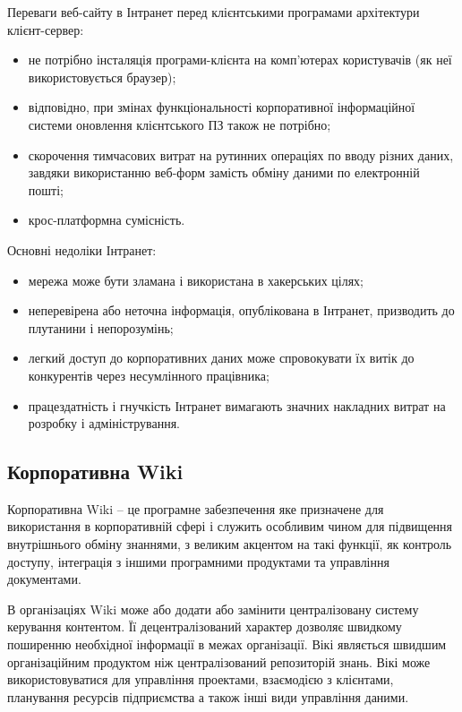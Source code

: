 Переваги веб-сайту в Інтранет перед клієнтськими програмами архітектури клієнт-сервер:
\begin{itemize}
\item не потрібно інсталяція програми-клієнта на комп'ютерах користувачів (як неї використовується браузер);
\item відповідно, при змінах функціональності корпоративної інформаційної системи оновлення клієнтського ПЗ також не потрібно;
\item  скорочення тимчасових витрат на рутинних операціях по вводу різних даних, завдяки використанню веб-форм замість обміну даними по електронній пошті;
\item крос-платформна сумісність.%
\end{itemize}


Основні недоліки Інтранет:
\begin{itemize}
\item мережа може бути зламана і використана в хакерських цілях;
\item неперевірена або неточна інформація, опублікована в Інтранет, призводить до плутанини і непорозумінь;
\item легкий доступ до корпоративних даних може спровокувати їх витік до конкурентів через несумлінного працівника;
\item працездатність і гнучкість Інтранет вимагають значних накладних витрат на розробку і адміністрування.
\end{itemize}








\subsection{Корпоративна Wiki}

Корпоративна Wiki -- це програмне забезпечення яке призначене для використання в корпоративній сфері і служить особливим чином для підвищення внутрішнього обміну знаннями, з великим акцентом на такі функції, як контроль доступу, інтеграція з іншими програмними продуктами та управління документами. 
\par В організаціях Wiki може або додати або замінити централізовану систему керування контентом. 
Її децентралізований характер дозволяє швидкому поширенню необхідної інформації в межах організації.
Вікі являється швидшим організаційним продуктом ніж централізований репозиторій знань.
Вікі може використовуватися для управління проектами, взаємодією з клієнтами, планування ресурсів підприємства а також інші види управління даними.

